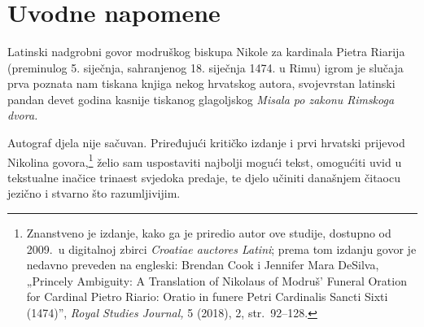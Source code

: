 \documentclass[a5paper,twoside]{article}
\renewcommand\Large{\fontsize{12.5}{13} \selectfont}
\begin{document}


\frenchspacing

\fontsize{11}{13.2}
\selectfont

\linespread{1.1}

\setlength{\parindent}{7mm}

\setcounter{page}{169}

\title{\Large{\MakeUppercase{Govor za Pietra Riarija (1474)}}}

\date{}%

\maketitle 

\thispagestyle{empty}

\section{Uvodne napomene}

Latinski nadgrobni govor modruškog biskupa Nikole za kardinala Pietra Riarija (preminulog 5. siječnja, sahranjenog 18. siječnja 1474. u Rimu) igrom je slučaja prva poznata nam tiskana knjiga nekog hrvatskog autora, svojevrstan latinski pandan devet godina kasnije tiskanog glagoljskog \textit{Misala po zakonu Rimskoga dvora.}

Autograf djela nije sačuvan. Priređujući kritičko izdanje i prvi hrvatski prijevod Nikolina govora,\footnote{Znanstveno je izdanje, kako ga je priredio autor ove studije, dostupno od 2009.\ u digitalnoj zbirci \textit{\textlatin{Croatiae auctores Latini}}; prema tom izdanju govor je nedavno preveden na engleski: Brendan Cook i Jennifer Mara DeSilva, „Princely Ambiguity: A Translation of Nikolaus of Modruš’ Funeral Oration for Cardinal Pietro Riario: Oratio in funere Petri Cardinalis Sancti Sixti (1474)”, \textit{Royal Studies Journal,} 5 (2018), 2, str.~92–128.} želio sam uspostaviti najbolji mogući tekst, omogućiti uvid u tekstualne inačice trinaest svjedoka predaje, te djelo učiniti današnjem čitaocu jezično i stvarno što razumljivijim.
\end{document}
